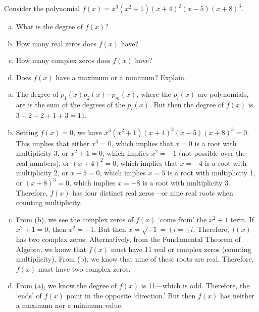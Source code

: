 \documentclass[11pt,letterpaper]{article}
\begin{document}

 Consider the polynomial $f(x)= x^3 (x^2 + 1) (x + 4)^2 (x - 5) (x + 8)^3$. 
	\begin{enumerate}[(a)]
	\item What is the degree of $f(x)$?
	\item How many real zeros does $f(x)$ have?
	\item How many complex zeros does $f(x)$ have?
	\item Does $f(x)$ have a maximum or a minimum? Explain. 
	\end{enumerate} \pspace

\sol 
\begin{enumerate}[(a)]
\item The degree of $p_1(x) p_2(x) \cdots p_m(x)$, where the $p_i(x)$ are polynomials, are is the sum of the degrees of the $p_i(x)$. But then the degree of $f(x)$ is $3 + 2 + 2 + 1 + 3= 11$. \pspace

\item Setting $f(x)= 0$, we have $x^3 (x^2 + 1) (x + 4)^2 (x - 5) (x + 8)^3= 0$. This implies that either $x^3= 0$, which implies that $x= 0$ is a root with multiplicity 3, or $x^2 + 1= 0$, which implies $x^2= -1$ (not possible over the real numbers), or $(x + 4)^2= 0$, which implies that $x= -4$ is a root with multiplicity 2, or $x - 5= 0$, which implies $x= 5$ is a root with multiplicity 1, or $(x + 8)^3= 0$, which implies $x= -8$ is a root with multiplicity 3. Therefore, $f(x)$ has four distinct real zeros---or nine real roots when counting multiplicity. \pspace

\item From (b), we see the complex zeros of $f(x)$ `come from' the $x^2 + 1$ term. If $x^2 + 1= 0$, then $x^2= -1$. But then $x= \sqrt{-1}= \pm i= \pm i$. Therefore, $f(x)$ has two complex zeros. Alternatively, from the Fundamental Theorem of Algebra, we know that $f(x)$ must have 11 real or complex zeros (counting multiplicity). From (b), we know that nine of these roots are real. Therefore, $f(x)$ must have two complex zeros. \pspace

\item From (a), we know the degree of $f(x)$ is 11---which is odd. Therefore, the `ends' of $f(x)$ point in the opposite `direction.' But then $f(x)$ has neither a maximum nor a minimum value. 
\end{enumerate}
\end{document}

